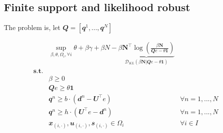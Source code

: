 \documentclass[
  a4paper,
,tablecaptionabove
]{scrartcl}
\numberwithin{equation}{section}
\begin{document}
\hypertarget{finite-support-and-likelihood-robust}{%
  \subsection{Finite support and likelihood
    robust}\label{finite-support-and-likelihood-robust}}

The problem is, let
\(\mathbfit Q = [\mathbfit{q}^1, ..., \mathbfit{q}^N]\)

\[\begin{aligned}
     & \sup_{\beta, \theta, \Omega_i, \forall i} \theta + \beta \gamma +  \beta N - \underbrace{\beta \mathbf N^\top \log(\frac{\beta \mathbf N}{\mathbfit{Q} e-\theta \mathbf 1})}_{\mathcal D_{KL}(\beta \mathbf N | \mathbfit{Q} e-\theta \mathbf 1)}                         \\
    \textbf {s.t.}                                                                                                                                                                                                                                                               \\
     & \beta \ge 0                                                                                                                                                                                                                                                               \\
     & \mathbfit{Q} e \ge \theta \mathbf 1                                                                                                                                                                                                                                       \\
     & \mathbfit q^n \ge b\cdot \left (\mathbfit d^n - \mathbfit{U}^\top e \right)                                                                                                                                                                       & \forall n = 1, ..., N \\
     & \mathbfit q^n \ge h\cdot \left ( \mathbfit{U}^\top e  -\mathbfit d^n  \right )                                                                                                                                                                    & \forall n = 1, ..., N \\
     & \mathbfit x_{(i,\cdot)}, \mathbfit u_{(i,\cdot)}, \mathbfit s_{(i,\cdot)} \in \Omega_i                                                                                                                                                            & \forall i\in I
  \end{aligned}\]
\end{document}
